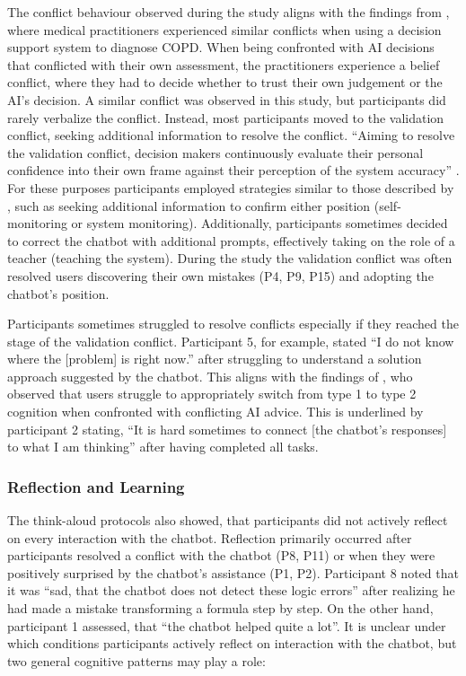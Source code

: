 The conflict behaviour observed during the study aligns with the findings from \textcite{Jussupow2021}, where medical practitioners experienced similar conflicts when using a decision support system to diagnose \ac{COPD}. When being confronted with AI decisions that conflicted with their own assessment, the practitioners experience a belief conflict, where they had to decide whether to trust their own judgement or the AI's decision. A similar conflict was observed in this study, but participants did rarely verbalize the conflict. Instead, most participants moved to the validation conflict, seeking additional information to resolve the conflict. “Aiming to resolve the validation conflict, decision makers continuously evaluate their personal confidence into their own frame against their perception of the system accuracy” \parencite{Jussupow2021}. For these purposes participants employed strategies similar to those described by \textcite{Jussupow2021}, such as seeking additional information to confirm either position (self-monitoring or system monitoring). Additionally, participants sometimes decided to correct the chatbot with additional prompts, effectively taking on the role of a teacher (teaching the system). During the study the validation conflict was often resolved users discovering their own mistakes (P4, P9, P15) and adopting the chatbot's position.

Participants sometimes struggled to resolve conflicts especially if they reached the stage of the validation conflict. Participant 5, for example, stated “I do not know where the [problem] is right now.” after struggling to understand a solution approach suggested by the chatbot. This aligns with the findings of \textcite{Jussupow2021}, who observed that users struggle to appropriately switch from type 1 to type 2 cognition when confronted with conflicting AI advice. This is underlined by participant 2 stating, “It is hard sometimes to connect [the chatbot's responses] to what I am thinking” after having completed all tasks.

\subsubsection{Reflection and Learning} \label{sssec:reflection_learning}

The think-aloud protocols also showed, that participants did not actively reflect on every interaction with the chatbot. Reflection primarily occurred after participants resolved a conflict with the chatbot (P8, P11) or when they were positively surprised by the chatbot's assistance (P1, P2). Participant 8 noted that it was “sad, that the chatbot does not detect these logic errors” after realizing he had made a mistake transforming a formula step by step. On the other hand, participant 1 assessed, that “the chatbot helped quite a lot”. It is unclear under which conditions participants actively reflect on interaction with the chatbot, but two general cognitive patterns may play a role:

